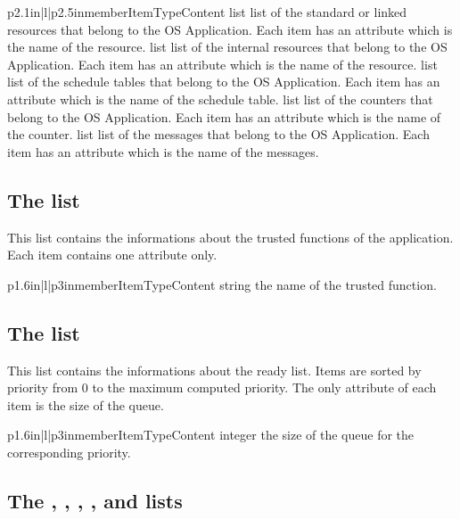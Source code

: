 \begin{longtableiii}{p{2.1in}|l|p{2.5in}}{member}{Item}{Type}{Content}
  {list}
  {list of the standard or linked resources that belong to the OS Application. Each item has an attribute  which is the name of the resource.}
  {list}
  {list of the internal resources that belong to the OS Application. Each item has an attribute  which is the name of the resource.}
  {list}
  {list of the schedule tables that belong to the OS Application. Each item has an attribute  which is the name of the schedule table.}
  {list}
  {list of the counters that belong to the OS Application. Each item has an attribute  which is the name of the counter.}
  {list}
  {list of the messages that belong to the OS Application. Each item has an attribute  which is the name of the messages.}
\end{longtableiii}

\subsection{The  list}

This list contains the informations about the trusted functions of the application. Each item contains one attribute only.

\begin{longtableiii}{p{1.6in}|l|p{3in}}{member}{Item}{Type}{Content}
  {string}
  {the name of the trusted function.}
\end{longtableiii}

\subsection{The  list}

This list contains the informations about the ready list. Items are sorted by priority from 0 to the maximum computed priority. The only attribute of each item is the size of the queue.

\begin{longtableiii}{p{1.6in}|l|p{3in}}{member}{Item}{Type}{Content}
  {integer}
  {the size of the queue for the corresponding priority.}
\end{longtableiii}

\subsection{The , , , ,  and  lists}

